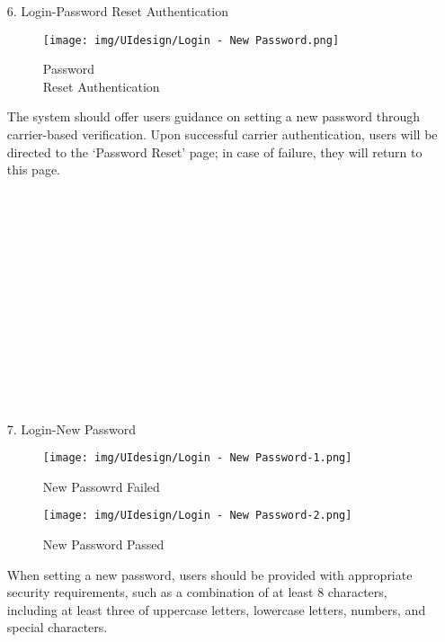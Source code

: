 \documentclass[conference]{IEEEtran}
\begin{document}
\begin{enumerate}
    \item[6.] Login-Password Reset Authentication
    \begin{figure}[h]
\hspace{1.5cm}
\centering
\begin{minipage}{0.4\columnwidth}
    \texttt{[image: img/UIdesign/Login - New Password.png]}
    \caption{Password \\ Reset Authentication}
\end{minipage}
\end{figure}
    
    The system should offer users guidance on setting a new password through carrier-based verification. Upon successful carrier authentication, users will be directed to the ‘Password Reset’ page; in case of failure, they will return to this page. \\ \\ \\ \\ \\ \\ \\ \\ \\ \\ \\ \\ \\ \\
    
\end{enumerate}



\begin{enumerate}
    \item[7.] Login-New Password
    \begin{figure}[h]
        \centering
        \begin{minipage}{0.4\columnwidth}
    \texttt{[image: img/UIdesign/Login - New Password-1.png]}
    \caption{New Passowrd Failed}
\end{minipage}
        \hfill
        \begin{minipage}{0.4\columnwidth}
    \texttt{[image: img/UIdesign/Login - New Password-2.png]}
    \caption{New Password Passed}
\end{minipage}
    \end{figure}

    When setting a new password, users should be provided with appropriate security requirements, such as a combination of at least 8 characters, including at least three of uppercase letters, lowercase letters, numbers, and special characters.
\end{enumerate}
\end{document}
